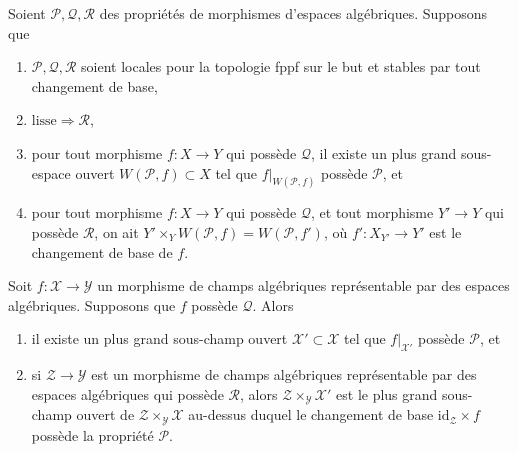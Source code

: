 \begin{lemma}
\label{lemma-local-source}
Soient $\mathcal{P}, \mathcal{Q}, \mathcal{R}$ des propriétés de morphismes
d'espaces algébriques. Supposons que
\begin{enumerate}
\item $\mathcal{P}, \mathcal{Q}, \mathcal{R}$ soient locales pour la topologie fppf sur le but
et stables par tout changement de base,
\item $\text{lisse} \Rightarrow \mathcal{R}$,
\item pour tout morphisme $f : X \to Y$ qui possède $\mathcal{Q}$, il existe un
plus grand sous-espace ouvert $W(\mathcal{P}, f) \subset X$ tel que
$f|_{W(\mathcal{P}, f)}$ possède $\mathcal{P}$, et
\item pour tout morphisme $f : X \to Y$ qui possède $\mathcal{Q}$,
et tout morphisme $Y' \to Y$ qui possède $\mathcal{R}$, on ait
$Y' \times_Y W(\mathcal{P}, f) = W(\mathcal{P}, f')$, où
$f' : X_{Y'} \to Y'$ est le changement de base de $f$.
\end{enumerate}
Soit $f : \mathcal{X} \to \mathcal{Y}$ un morphisme de champs algébriques
représentable par des espaces algébriques. Supposons que $f$ possède $\mathcal{Q}$. Alors
\begin{enumerate}
\item[(A)] il existe un plus grand sous-champ ouvert
$\mathcal{X}' \subset \mathcal{X}$ tel que $f|_{\mathcal{X}'}$ possède
$\mathcal{P}$, et
\item[(B)] si $\mathcal{Z} \to \mathcal{Y}$ est un morphisme de champs
algébriques représentable par des espaces algébriques qui possède $\mathcal{R}$,
alors $\mathcal{Z} \times_\mathcal{Y} \mathcal{X}'$ est le plus grand sous-champ
ouvert de $\mathcal{Z} \times_\mathcal{Y} \mathcal{X}$ au-dessus duquel
le changement de base $\text{id}_\mathcal{Z} \times f$ possède la propriété $\mathcal{P}$.
\end{enumerate}
\end{lemma}

